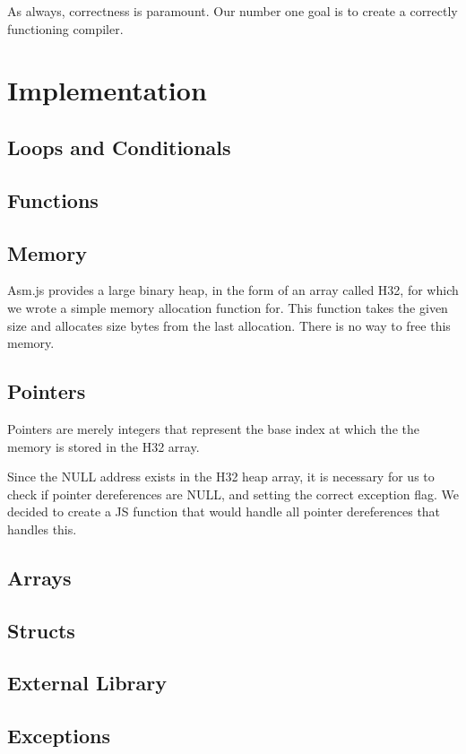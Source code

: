 \documentclass[twoside]{article}
\begin{document}
\begin{multicols}{2}
As always, correctness is paramount. Our number one goal is to create a correctly
functioning compiler.


\section{Implementation}

  \subsection{Loops and Conditionals}
  \subsection{Functions}
  \subsection{Memory}
    Asm.js provides a large binary heap, in the form of an array called H32, for which we
    wrote a simple memory allocation function for. This function takes the given
    size and allocates size bytes from the last allocation. There is no way to
    free this memory.
  \subsection{Pointers}
    Pointers are merely integers that represent the base index at which the
    the memory is stored in the H32 array.

    Since the NULL address exists in the H32 heap array, it is necessary for
    us to check if pointer dereferences are NULL, and setting the correct
    exception flag. We decided to create a JS function that would handle all
    pointer dereferences that handles this.
  \subsection{Arrays}
  \subsection{Structs}
  \subsection{External Library}
  \subsection{Exceptions}


\end{multicols}
\end{document}
